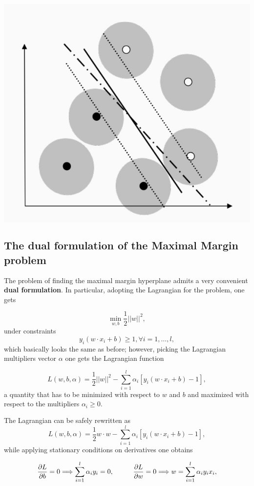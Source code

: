 \documentclass[10pt]{report}
\begin{document}
\begin{center}
\includegraphics[width=.9\linewidth]{./pics/svm/mm-parameter-noise.jpg}
\end{center}

\subsection{The dual formulation of the Maximal Margin problem}
\label{the-dual-formulation-of-the-maximal-margin-problem}
The problem of finding the maximal margin hyperplane admits a very convenient
\textbf{dual formulation}. In particular, adopting the Lagrangian for the problem, one
gets

\[\min_{w,b} \frac 1 2 ||w||^2,\] under constraints
\[y_i(w \cdot x_i + b) \geq 1, \forall i=1, \dots, l,\] which basically
looks the same as before; however, picking the Lagrangian multipliers
vector \(\alpha\) one gets the Lagrangian function

\[L(w, b, \alpha) = \frac 1 2 ||w||^2 - \sum_{i=1}^l \alpha_i[y_i(w \cdot x_i + b) - 1],\]
a quantity that has to be minimized with respect to \(w\) and \(b\) and
maximized with respect to the multipliers \(\alpha_i \geq 0\).

The Lagrangian can be safely rewritten as
\[L(w, b, \alpha) = \frac 1 2 w\cdot w - \sum_{i=1}^l \alpha_i[y_i(w \cdot x_i + b) - 1],\]
while applying stationary conditions on derivatives one obtains

\[ \frac {\partial L}{\partial b} = 0 \Longrightarrow \sum_{i=1}^l \alpha_i y_i = 0, \hspace*{1cm} \frac {\partial L}{\partial w} = 0 \Longrightarrow w = \sum_{i=1}^l \alpha_i y_i x_i, \]
\end{document}

